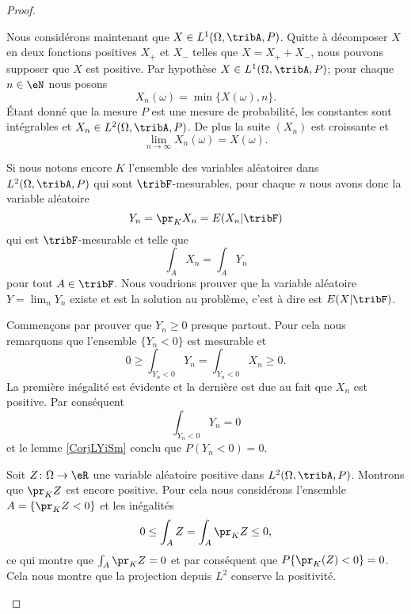 \begin{proof}
\begin{description}
            Nous considérons maintenant que \( X\in L^1(\Omega,\tribA,P)\). Quitte à décomposer \( X\) en deux fonctions positives \( X_+\) et \( X_-\) telles que \( X=X_++X_-\), nous pouvons supposer que \( X\) est positive. Par hypothèse \( X\in L^1(\Omega,\tribA,P)\); pour chaque \( n\in\eN\) nous posons
            \begin{equation}
                X_n(\omega)=\min\{ X(\omega),n \}.
            \end{equation}
            Étant donné que la mesure \( P\) est une mesure de probabilité, les constantes sont intégrables et \( X_n\in L^2(\Omega,\tribA,P)\). De plus la suite \( (X_n)\) est croissante et
            \begin{equation}
                \lim_{n\to \infty} X_n(\omega)=X(\omega).
            \end{equation}

            Si nous notons encore \( K\) l'ensemble des variables aléatoires dans \( L^2(\Omega,\tribA,P)\) qui sont \( \tribF\)-mesurables, pour chaque \( n\) nous avons donc la variable aléatoire 
            \begin{equation}
                Y_n=\pr_KX_n=E(X_n|\tribF)
            \end{equation}
            qui est \( \tribF\)-mesurable et telle que
            \begin{equation}
                \int_A X_n=\int_AY_n
            \end{equation}
            pour tout \( A\in\tribF\). Nous voudrions prouver que la variable aléatoire \( Y=\lim_nY_n\) existe et est la solution au problème, c'est à dire est \( E(X|\tribF)\). 

            Commençons par prouver que \( Y_n\geq 0\) presque partout. Pour cela nous remarquons que l'ensemble \( \{ Y_n<0 \}\) est mesurable et
            \begin{equation}
                0\geq\int_{Y_n<0}Y_n=\int_{Y_n<0}X_n\geq 0.
            \end{equation}
            La première inégalité est évidente et la dernière est due au fait que \( X_n\) est positive. Par conséquent
            \begin{equation}
                \int_{Y_n<0}Y_n=0
            \end{equation}
            et le lemme \ref{CorjLYiSm} conclu que \( P(Y_n<0)=0\).

            Soit \( Z\colon \Omega\to \eR\) une variable aléatoire positive dans \( L^2(\Omega,\tribA,P)\). Montrons que \( \pr_KZ\) est encore positive. Pour cela nous considérons l'ensemble \( A=\{ \pr_KZ<0 \}\) et les inégalités
            \begin{equation}
                0\leq \int_AZ=\int_A\pr_KZ\leq 0,
            \end{equation}
            ce qui montre que \( \int_A\pr_KZ=0\) et par conséquent que \( P\{ \pr_K(Z)<0 \}=0\). Cela nous montre que la projection depuis \( L^2\) conserve la positivité.


\end{description}
\end{proof}
